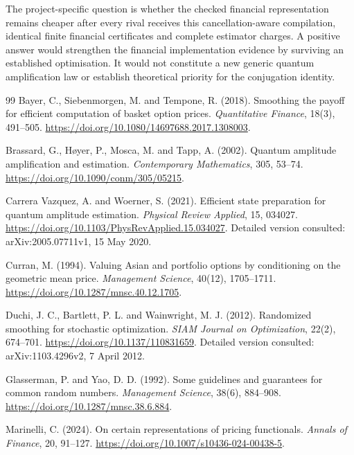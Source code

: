 \documentclass[11pt]{article}
\begin{document}
The project-specific question is whether the checked financial
representation remains cheaper after every rival receives this
cancellation-aware compilation, identical finite financial
certificates and complete estimator charges. A positive answer would
strengthen the financial implementation evidence by surviving an
established optimisation. It would not constitute a new generic
quantum amplification law or establish theoretical priority for the
conjugation identity.

\begin{thebibliography}{99}
Bayer, C., Siebenmorgen, M. and Tempone, R. (2018).
Smoothing the payoff for efficient computation of basket option prices.
\emph{Quantitative Finance}, 18(3), 491--505.
\url{https://doi.org/10.1080/14697688.2017.1308003}.

Brassard, G., H\o yer, P., Mosca, M. and Tapp, A. (2002).
Quantum amplitude amplification and estimation.
\emph{Contemporary Mathematics}, 305, 53--74.
\url{https://doi.org/10.1090/conm/305/05215}.

Carrera Vazquez, A. and Woerner, S. (2021). Efficient state preparation for quantum amplitude estimation.
\emph{Physical Review Applied}, 15, 034027. \url{https://doi.org/10.1103/PhysRevApplied.15.034027}.
Detailed version consulted: arXiv:2005.07711v1, 15 May 2020.

Curran, M. (1994). Valuing Asian and portfolio options by conditioning
on the geometric mean price.
\emph{Management Science}, 40(12), 1705--1711.
\url{https://doi.org/10.1287/mnsc.40.12.1705}.

Duchi, J. C., Bartlett, P. L. and Wainwright, M. J. (2012). Randomized smoothing for stochastic optimization.
\emph{SIAM Journal on Optimization}, 22(2), 674--701. \url{https://doi.org/10.1137/110831659}.
Detailed version consulted: arXiv:1103.4296v2, 7 April 2012.

Glasserman, P. and Yao, D. D. (1992). Some guidelines and guarantees for common random numbers.
\emph{Management Science}, 38(6), 884--908. \url{https://doi.org/10.1287/mnsc.38.6.884}.

Marinelli, C. (2024). On certain representations of pricing functionals.
\emph{Annals of Finance}, 20, 91--127. \url{https://doi.org/10.1007/s10436-024-00438-5}.


\end{thebibliography}
\end{document}
